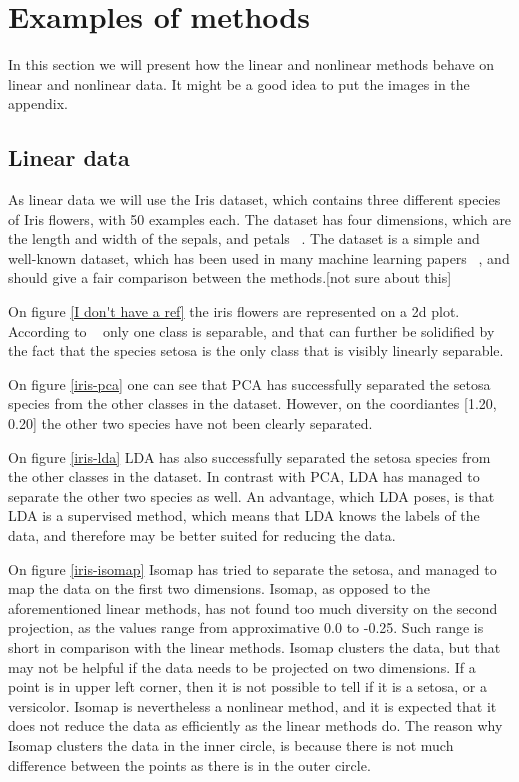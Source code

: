 \section{Examples of methods}
In this section we will present how the linear and nonlinear methods behave on linear and nonlinear data. It might be a good idea to put the images in the appendix.


\subsection{Linear data}
As linear data we will use the Iris dataset, which contains three different species of Iris flowers, with 50 examples each. The dataset has four dimensions, which are the length and width of the sepals, and petals ~\cite{iris-dataset}. The dataset is a simple and well-known dataset, which has been used in many machine learning papers ~\cite{iris-dataset}, and should give a fair comparison between the methods.[not sure about this]


On figure \ref{I don't have a ref} the iris flowers are represented on a 2d plot. According to ~\cite{iris-dataset} only one class is separable, and that can further be solidified by the fact that the species setosa is the only class that is visibly linearly separable.


On figure \ref{iris-pca} one can see that PCA has successfully separated the setosa species from the other classes in the dataset. However, on the coordiantes [1.20, 0.20] the other two species have not been clearly separated.

On figure \ref{iris-lda} LDA has also successfully separated the setosa species from the other classes in the dataset. In contrast with PCA, LDA has managed to separate the other two species as well. An advantage, which LDA poses, is that LDA is a supervised method, which means that LDA knows the labels of the data, and therefore may be better suited for reducing the data.



On figure \ref{iris-isomap} Isomap has tried to separate the setosa, and managed to map the data on the first two dimensions. Isomap, as opposed to the aforementioned linear methods, has not found too much diversity on the second projection, as the values range from approximative 0.0 to -0.25. Such range is short in comparison with the linear methods. Isomap clusters the data, but that may not be helpful if the data needs to be projected on two dimensions. If a point is in upper left corner, then it is not possible to tell if it is a setosa, or a versicolor. Isomap is nevertheless a nonlinear method, and it is expected that it does not reduce the data as efficiently as the linear methods do. The reason why Isomap clusters the data in the inner circle, is because there is not much difference between the points as there is in the outer circle.


